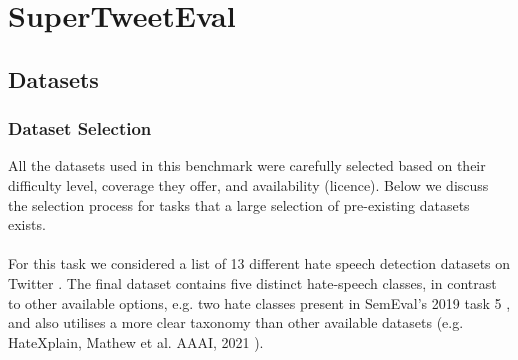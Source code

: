 \begin{table}[ht]
\centering
{}
\caption{Best hyper-parameters for models trained on the combined datasets for the binary and multiclass settings.}
\label{tab:hyperparameters}
\end{table}


\section{SuperTweetEval}

\subsection{Datasets}
\label{appendix:SuperTweetEval}
\subsubsection{Dataset Selection}
\label{appendix:SuperTweetEval-data_selection}
All the datasets used in this benchmark were carefully selected based on their difficulty level, coverage they offer, and availability (licence). Below we discuss the selection process for tasks that a large selection of pre-existing datasets exists.
 
 \paragraph{{\TweetHate}} For this task we considered a list of 13 different hate speech detection datasets on Twitter \cite{sachdeva-etal-2022-measuring,samory2021call,grimminger-klinger-2021-hate,mathew2021hatexplain,zampieri-etal-2019-predicting,davidson2017automated,waseem-hovy-2016-hateful,waseem-2016-racist,ousidhoum-etal-2019-multilingual,basile-etal-2019-semeval,mandl2019overview,vidgen-etal-2020-detecting,founta2018large}. The final dataset contains five distinct hate-speech classes, in contrast to other available options, e.g. two hate classes present in SemEval's 2019 task 5 \cite{basile-etal-2019-semeval}, and also utilises a more clear taxonomy than other available datasets (e.g. HateXplain, Mathew et al. AAAI, 2021 \cite{mathew2021hatexplain}).

